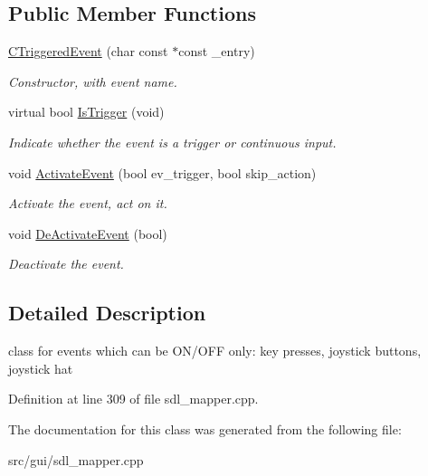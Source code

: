 \subsection*{Public Member Functions}
\begin{DoxyCompactItemize}
\item 
\hypertarget{classCTriggeredEvent_ac9f3fc82121e3632950dfd89e37fc90d}{\hyperlink{classCTriggeredEvent_ac9f3fc82121e3632950dfd89e37fc90d}{C\-Triggered\-Event} (char const $\ast$const \-\_\-entry)}\label{classCTriggeredEvent_ac9f3fc82121e3632950dfd89e37fc90d}

\begin{DoxyCompactList}\small\item\em Constructor, with event name. \end{DoxyCompactList}\item 
\hypertarget{classCTriggeredEvent_a4ab6cb9bc929db0b4281218ff1205cb6}{virtual bool \hyperlink{classCTriggeredEvent_a4ab6cb9bc929db0b4281218ff1205cb6}{Is\-Trigger} (void)}\label{classCTriggeredEvent_a4ab6cb9bc929db0b4281218ff1205cb6}

\begin{DoxyCompactList}\small\item\em Indicate whether the event is a trigger or continuous input. \end{DoxyCompactList}\item 
\hypertarget{classCTriggeredEvent_ab438d4c740739216ae049088f887e6bb}{void \hyperlink{classCTriggeredEvent_ab438d4c740739216ae049088f887e6bb}{Activate\-Event} (bool ev\-\_\-trigger, bool skip\-\_\-action)}\label{classCTriggeredEvent_ab438d4c740739216ae049088f887e6bb}

\begin{DoxyCompactList}\small\item\em Activate the event, act on it. \end{DoxyCompactList}\item 
\hypertarget{classCTriggeredEvent_a14ad33e00067cce7d4a9266888e24192}{void \hyperlink{classCTriggeredEvent_a14ad33e00067cce7d4a9266888e24192}{De\-Activate\-Event} (bool)}\label{classCTriggeredEvent_a14ad33e00067cce7d4a9266888e24192}

\begin{DoxyCompactList}\small\item\em Deactivate the event. \end{DoxyCompactList}\end{DoxyCompactItemize}


\subsection{Detailed Description}
class for events which can be O\-N/\-O\-F\-F only\-: key presses, joystick buttons, joystick hat 

Definition at line 309 of file sdl\-\_\-mapper.\-cpp.



The documentation for this class was generated from the following file\-:\begin{DoxyCompactItemize}
\item 
src/gui/sdl\-\_\-mapper.\-cpp\end{DoxyCompactItemize}
